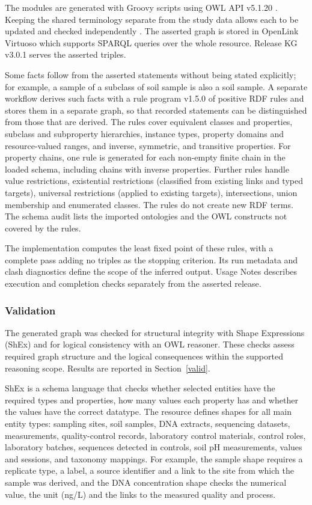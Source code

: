 \begin{revision}
The modules are generated with Groovy scripts using OWL API v5.1.20 \cite{owlapi}.
Keeping the shared terminology separate from the study data allows each to be updated and checked independently
\cite{cuencagrau2008modular}. The asserted graph is stored in OpenLink Virtuoso \cite{virtuoso} which supports SPARQL queries over the whole resource. Release KG v3.0.1 serves the asserted triples.

Some facts follow from the asserted statements without being stated
explicitly; for example, a sample of a subclass of soil sample is also a
soil sample. A separate workflow derives such facts with a rule program v1.5.0 of positive RDF rules and stores them in a separate graph, so that recorded statements can be distinguished from those that are derived. The rules cover equivalent classes and properties, subclass and subproperty hierarchies, instance types, property domains and resource-valued ranges, and inverse, symmetric, and transitive properties. For property chains, one rule is generated for each non-empty finite chain in the loaded schema, including chains with inverse properties. Further rules handle value restrictions, existential restrictions (classified from
existing links and typed targets), universal restrictions (applied to
existing targets), intersections, union membership and enumerated classes.
The rules do not create new RDF terms. The schema audit lists the imported
ontologies and the OWL constructs not covered by the rules.

The implementation computes the least fixed point of these rules, with a complete pass adding no triples as the stopping criterion. Its run metadata and clash diagnostics define the scope of the inferred output. Usage Notes describes execution and completion checks separately from the asserted release.

\subsubsection{Validation}\label{subsec:schema_def}
The generated graph was checked for structural integrity with Shape Expressions (ShEx) and for logical consistency with an OWL reasoner. These checks assess required graph structure and the logical consequences within the supported reasoning scope. Results are reported in Section~\ref{valid}.

ShEx \cite{shex} is a schema language that checks whether selected
entities have the required types and properties, how many values each
property has and whether the values have the correct datatype. The resource defines
shapes for all main entity types: sampling sites, soil samples, DNA
extracts, sequencing datasets, measurements, quality-control records,
laboratory control materials, control roles, laboratory batches, sequences
detected in controls, soil pH measurements, values and sessions, and
taxonomy mappings. For example, the sample shape requires a replicate
type, a label, a source identifier and a link to the site from which the
sample was derived, and the DNA concentration shape checks the numerical
value, the unit (ng/\textmu L) and the links to the measured quality and
process.


\end{revision}
